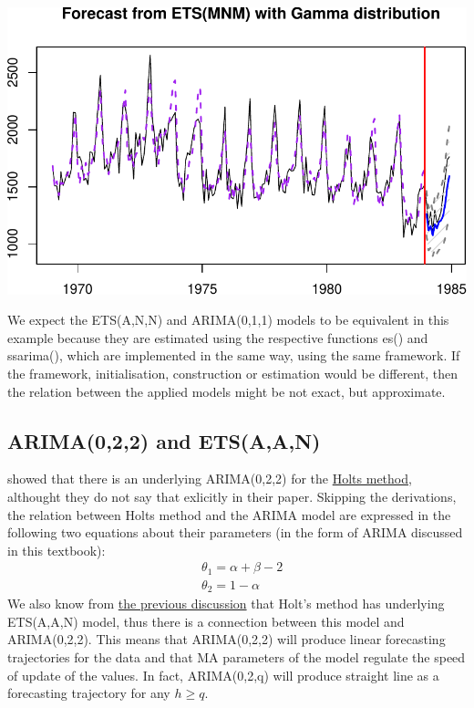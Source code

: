 \documentclass[
]{book}
\theoremstyle{definition}
\theoremstyle{definition}
\theoremstyle{definition}
\theoremstyle{definition}
\theoremstyle{remark}
\begin{document}
\includegraphics{adam_files/figure-latex/unnamed-chunk-57-1.pdf}

We expect the ETS(A,N,N) and ARIMA(0,1,1) models to be equivalent in this example because they are estimated using the respective functions es() and ssarima(), which are implemented in the same way, using the same framework. If the framework, initialisation, construction or estimation would be different, then the relation between the applied models might be not exact, but approximate.

\hypertarget{ARIMAETS022}{%
\subsection{ARIMA(0,2,2) and ETS(A,A,N)}\label{ARIMAETS022}}

\citet{Nerlove1964} showed that there is an underlying ARIMA(0,2,2) for the \protect\hyperlink{ETSAAN}{Holts method}, althought they do not say that exlicitly in their paper. Skipping the derivations, the relation between Holts method and the ARIMA model are expressed in the following two equations about their parameters (in the form of ARIMA discussed in this textbook):
\begin{equation*}
  \begin{aligned}
    &\theta_1 = \alpha + \beta - 2 \\
    &\theta_2 = 1 -\alpha
  \end{aligned}
\end{equation*}
We also know from \protect\hyperlink{ETSExamples}{the previous discussion} that Holt's method has underlying ETS(A,A,N) model, thus there is a connection between this model and ARIMA(0,2,2). This means that ARIMA(0,2,2) will produce linear forecasting trajectories for the data and that MA parameters of the model regulate the speed of update of the values. In fact, ARIMA(0,2,q) will produce straight line as a forecasting trajectory for any \(h\geq q\).
\end{document}
